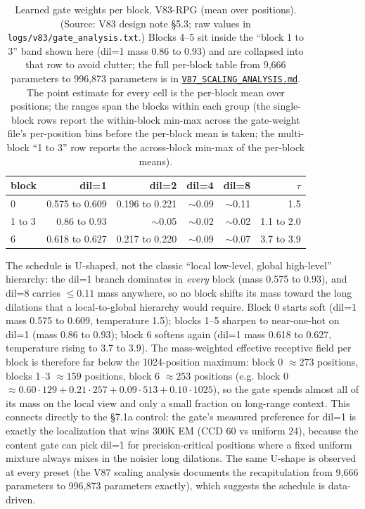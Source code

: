 \documentclass[11pt]{article}
\begin{document}
\begin{table}[!t]
\small
\caption{Learned gate weights per block, V83-RPG (mean over positions). (Source: V83 design note \S5.3; raw values in \texttt{logs/v83/gate\_analysis.txt}.) Blocks 4--5 sit inside the ``block 1 to 3'' band shown here (dil=1 mass 0.86 to 0.93) and are collapsed into that row to avoid clutter; the full per-block table from 9,666 parameters to 996,873 parameters is in \href{https://github.com/llaa33219/MicroMixer-4/blob/4bb630413dfa58ef3141291e121ab8c006d03235/V87_SCALING_ANALYSIS.md}{\texttt{V87\_SCALING\_ANALYSIS.md}}. The point estimate for every cell is the per-block mean over positions; the ranges span the blocks within each group (the single-block rows report the within-block min-max across the gate-weight file's per-position bins before the per-block mean is taken; the multi-block ``1 to 3'' row reports the across-block min-max of the per-block means).}
\label{tab:gate-weights}
\centering
\begin{tabular}{lrrrrr}
\toprule
block & dil=1 & dil=2 & dil=4 & dil=8 & $\tau$ \\
\midrule
0     & 0.575 to 0.609 & 0.196 to 0.221 & $\sim$0.09 & $\sim$0.11 & 1.5 \\
1 to 3   & 0.86 to 0.93   & $\sim$0.05       & $\sim$0.02 & $\sim$0.02 & 1.1 to 2.0 \\
6     & 0.618 to 0.627 & 0.217 to 0.220 & $\sim$0.09 & $\sim$0.07 & 3.7 to 3.9 \\
\bottomrule
\end{tabular}
\end{table}

The schedule is U-shaped, not the classic ``local low-level, global high-level'' hierarchy: the dil=1 branch dominates in \emph{every} block (mass 0.575 to 0.93), and dil=8 carries $\le 0.11$ mass anywhere, so no block shifts its mass toward the long dilations that a local-to-global hierarchy would require. Block 0 starts soft (dil=1 mass 0.575 to 0.609, temperature 1.5); blocks 1--5 sharpen to near-one-hot on dil=1 (mass 0.86 to 0.93); block 6 softens again (dil=1 mass 0.618 to 0.627, temperature rising to 3.7 to 3.9). The mass-weighted effective receptive field per block is therefore far below the 1024-position maximum: block 0 $\approx 273$ positions, blocks 1--3 $\approx 159$ positions, block 6 $\approx 253$ positions (e.g. block 0 $\approx 0.60 \cdot 129 + 0.21 \cdot 257 + 0.09 \cdot 513 + 0.10 \cdot 1025$), so the gate spends almost all of its mass on the local view and only a small fraction on long-range context. This connects directly to the \S7.1a control: the gate's measured preference for dil=1 is exactly the localization that wins 300K EM (CCD 60 vs uniform 24), because the content gate can pick dil=1 for precision-critical positions where a fixed uniform mixture always mixes in the noisier long dilations. The same U-shape is observed at every preset (the V87 scaling analysis documents the recapitulation from 9,666 parameters to 996,873 parameters exactly), which suggests the schedule is data-driven.
\end{document}
